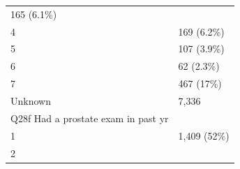 \documentclass[]{article}
\begin{document}
\begin{longtable}[]{@{}ll@{}}
\begin{minipage}[t]{0.23\columnwidth}
165 (6.1\%)\strut
\end{minipage}\tabularnewline
\begin{minipage}[t]{0.71\columnwidth}\raggedright
4\strut
\end{minipage} & \begin{minipage}[t]{0.23\columnwidth}\raggedright
169 (6.2\%)\strut
\end{minipage}\tabularnewline
\begin{minipage}[t]{0.71\columnwidth}\raggedright
5\strut
\end{minipage} & \begin{minipage}[t]{0.23\columnwidth}\raggedright
107 (3.9\%)\strut
\end{minipage}\tabularnewline
\begin{minipage}[t]{0.71\columnwidth}\raggedright
6\strut
\end{minipage} & \begin{minipage}[t]{0.23\columnwidth}\raggedright
62 (2.3\%)\strut
\end{minipage}\tabularnewline
\begin{minipage}[t]{0.71\columnwidth}\raggedright
7\strut
\end{minipage} & \begin{minipage}[t]{0.23\columnwidth}\raggedright
467 (17\%)\strut
\end{minipage}\tabularnewline
\begin{minipage}[t]{0.71\columnwidth}\raggedright
Unknown\strut
\end{minipage} & \begin{minipage}[t]{0.23\columnwidth}\raggedright
7,336\strut
\end{minipage}\tabularnewline
\begin{minipage}[t]{0.71\columnwidth}\raggedright
Q28f Had a prostate exam in past yr\strut
\end{minipage} & \begin{minipage}[t]{0.23\columnwidth}\raggedright
\strut
\end{minipage}\tabularnewline
\begin{minipage}[t]{0.71\columnwidth}\raggedright
1\strut
\end{minipage} & \begin{minipage}[t]{0.23\columnwidth}\raggedright
1,409 (52\%)\strut
\end{minipage}\tabularnewline
\begin{minipage}[t]{0.71\columnwidth}\raggedright
2\strut
\end{minipage} & \begin{minipage}[t]{0.23\columnwidth}\raggedright

\end{minipage}
\end{longtable}
\end{document}
